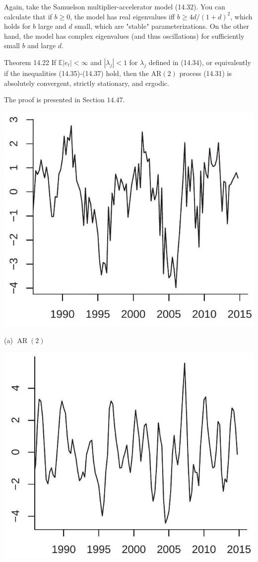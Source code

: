 \documentclass[10pt]{article}
\begin{document}
Again, take the Samuelson multiplier-accelerator model (14.32). You can calculate that if $b \geq 0$, the model has real eigenvalues iff $b \geq 4 d /(1+d)^{2}$, which holds for $b$ large and $d$ small, which are "stable" parameterizations. On the other hand, the model has complex eigenvalues (and thus oscillations) for sufficiently small $b$ and large $d$.

Theorem 14.22 If $\mathbb{E}\left|e_{t}\right|<\infty$ and $\left|\lambda_{j}\right|<1$ for $\lambda_{j}$ defined in (14.34), or equivalently if the inequalities (14.35)-(14.37) hold, then the $\mathrm{AR}(2)$ process (14.31) is absolutely convergent, strictly stationary, and ergodic.

The proof is presented in Section $14.47$.

\includegraphics[max width=\textwidth]{2022_10_23_6047885e7d154c9f28afg-30}

(a) $\operatorname{AR}(2)$

\includegraphics[max width=\textwidth]{2022_10_23_6047885e7d154c9f28afg-30(1)}
\end{document}
